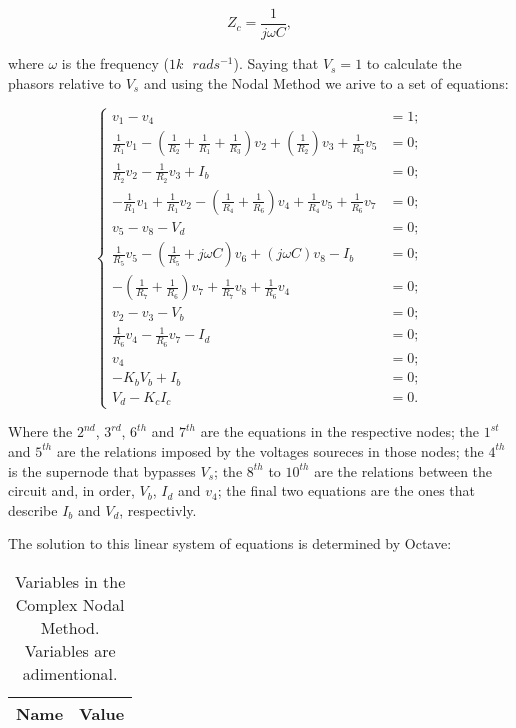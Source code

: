 \begin{equation}
	Z_c = \frac{1}{j \omega C},
\end{equation}

where $\omega$ is the frequency ($1k \text{ }rads^{-1}$).
Saying that $V_s = 1$ to calculate the phasors relative to $V_s$ and using the Nodal Method we arive to a set of equations:

\begin{equation}
\begin{cases}
	v_1 - v_4 &= 1;																				  	  \\
	\frac{1}{R_1}v_1 - (\frac{1}{R_2}+\frac{1}{R_1}+\frac{1}{R_3})v_2 + (\frac{1}{R_2})v_3 + \frac{1}{R_3}v_5 &= 0; \\
  	\frac{1}{R_2}v_2 - \frac{1}{R_2}v_3+ I_b &= 0;													  \\
  	-\frac{1}{R_1}v_1 + \frac{1}{R_1}v_2 - (\frac{1}{R_4}+\frac{1}{R_6})v_4 + \frac{1}{R_4}v_5 + \frac{1}{R_6}v_7 &= 0;			  																	  \\
	v_5 - v_8 - V_d &= 0;																			  \\
  	\frac{1}{R_5}v_5 - (\frac{1}{R_5} + j \omega C)v_6 + (j \omega C)v_8- I_b &= 0;						  \\
  	-(\frac{1}{R_7}+\frac{1}{R_6})v_7 + \frac{1}{R_7}v_8 + \frac{1}{R_6}v_4 &= 0;					  \\
	v_2 - v_3 - V_b &= 0;																			  \\
  	\frac{1}{R_6}v_4 - \frac{1}{R_6}v_7 - I_d &= 0;													  \\
  	v_4 &= 0;																						  \\
  	-K_bV_b + I_b &= 0;																				  \\
  	V_d - K_cI_c &= 0.
\end{cases}
\label{eq:PASSO4}
\end{equation}

Where the $2^{nd}$, $3^{rd}$, $6^{th}$ and $7^{th}$ are the equations in the respective nodes; the $1^{st}$ and $5^{th}$ are the relations imposed by the voltages soureces in those nodes; the $4^{th}$ is the supernode that bypasses $V_s$; the $8^{th}$ to $10^{th}$ are the relations between the circuit and, in order, $V_b$, $I_d$ and $v_4$; the final two equations are the ones that describe $I_b$ and $V_d$, respectivly. 

The solution to this linear system of equations is determined by Octave:

\begin{table}[h]
  \centering
  \begin{tabular}{|l|r|}
    \hline    
    {\bf Name} & {\bf Value} \\ \hline
    
  \end{tabular}
  \caption{Variables in the Complex Nodal Method. Variables are adimentional.}
  \label{tab:TEO_PASSO4}
\end{table}

